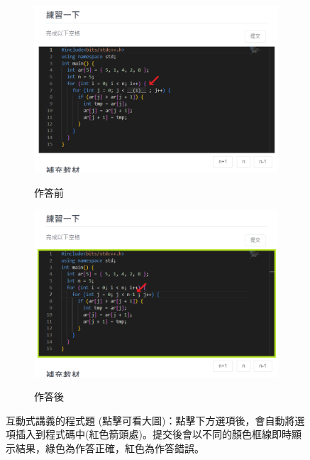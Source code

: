 \documentclass[12pt]{article}
\begin{document}
\begin{enumerate}[label=(\arabic*)]
\begin{itemize}
      \begin{figure}[H]
        \begin{subfigure}{0.5\linewidth}
          \centering
          \href{https://raw.githubusercontent.com/programingtw/proglearn-plan/main/2023全國大專校院智慧創新暨跨域整合創作競賽/img/problem.png}{
            \includegraphics[width=1\textwidth]{./img/problem.png}
          }
          \caption{作答前}
        \end{subfigure}
        \label{arc8}
        \begin{subfigure}{0.5\linewidth}
          \centering
          \href{https://raw.githubusercontent.com/programingtw/proglearn-plan/main/2023全國大專校院智慧創新暨跨域整合創作競賽/img/problem2.png}{
            \includegraphics[width=1\textwidth]{./img/problem2.png}
          }
          \caption{作答後}
        \end{subfigure}
        \label{arc9}
        \caption{互動式講義的程式題 (點擊可看大圖)：點擊下方選項後，會自動將選項插入到程式碼中(紅色箭頭處)。提交後會以不同的顏色框線即時顯示結果，綠色為作答正確，紅色為作答錯誤。}
      \end{figure}

  \end{itemize}
\end{enumerate}
\end{document}

